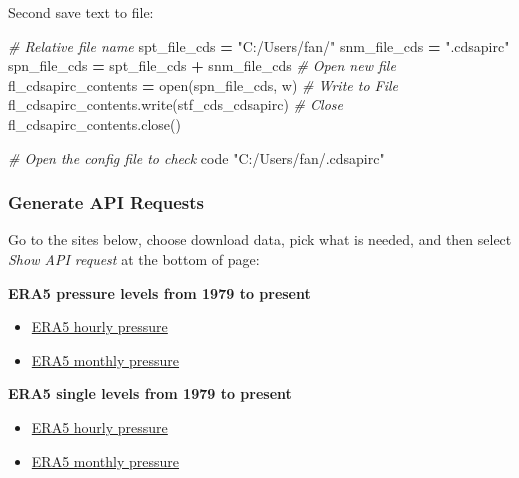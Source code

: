 \documentclass[
]{book}
\newenvironment{Shaded}{\begin{snugshade}}{\end{snugshade}}
\newcommand{\BuiltInTok}[1]{#1}
\newcommand{\CommentTok}[1]{\textcolor[rgb]{0.56,0.35,0.01}{\textit{#1}}}
\newcommand{\ExtensionTok}[1]{#1}
\newcommand{\NormalTok}[1]{#1}
\newcommand{\OperatorTok}[1]{\textcolor[rgb]{0.81,0.36,0.00}{\textbf{#1}}}
\newcommand{\StringTok}[1]{\textcolor[rgb]{0.31,0.60,0.02}{#1}}
\providecommand{\tightlist}{%
  \setlength{\itemsep}{0pt}\setlength{\parskip}{0pt}}
\begin{document}
Second save text to file:

\begin{Shaded}
\begin{Highlighting}[]
\CommentTok{\# Relative file name}
\NormalTok{spt\_file\_cds }\OperatorTok{=} \StringTok{"C:/Users/fan/"}
\NormalTok{snm\_file\_cds }\OperatorTok{=} \StringTok{".cdsapirc"}
\NormalTok{spn\_file\_cds }\OperatorTok{=}\NormalTok{ spt\_file\_cds }\OperatorTok{+}\NormalTok{ snm\_file\_cds }
\CommentTok{\# Open new file}
\NormalTok{fl\_cdsapirc\_contents }\OperatorTok{=} \BuiltInTok{open}\NormalTok{(spn\_file\_cds, }\StringTok{\textquotesingle{}w\textquotesingle{}}\NormalTok{)}
\CommentTok{\# Write to File}
\NormalTok{fl\_cdsapirc\_contents.write(stf\_cds\_cdsapirc)}
\CommentTok{\# Close}
\NormalTok{fl\_cdsapirc\_contents.close()}
\end{Highlighting}
\end{Shaded}

\begin{Shaded}
\begin{Highlighting}[]
\CommentTok{\# Open the config file to check}
\ExtensionTok{code} \StringTok{"C:/Users/fan/.cdsapirc"}
\end{Highlighting}
\end{Shaded}

\hypertarget{generate-api-requests}{%
\subsubsection{Generate API Requests}\label{generate-api-requests}}

Go to the sites below, choose download data, pick what is needed, and then select \emph{Show API request} at the bottom of page:

\textbf{ERA5 pressure levels from 1979 to present}

\begin{itemize}
\tightlist
\item
  \href{https://cds.climate.copernicus.eu/cdsapp\#!/dataset/reanalysis-era5-pressure-levels}{ERA5 hourly pressure}
\item
  \href{https://cds.climate.copernicus.eu/cdsapp\#!/dataset/reanalysis-era5-pressure-levels-monthly-means}{ERA5 monthly pressure}
\end{itemize}

\textbf{ERA5 single levels from 1979 to present}

\begin{itemize}
\tightlist
\item
  \href{https://cds.climate.copernicus.eu/cdsapp\#!/dataset/reanalysis-era5-single-levels}{ERA5 hourly pressure}
\item
  \href{https://cds.climate.copernicus.eu/cdsapp\#!/dataset/reanalysis-era5-single-levels-monthly-means}{ERA5 monthly pressure}
\end{itemize}
\end{document}
